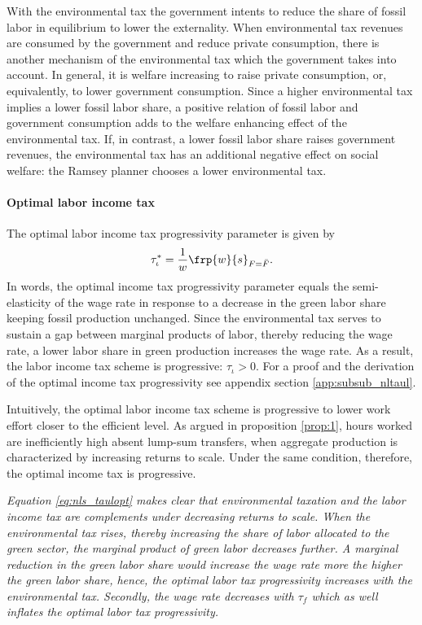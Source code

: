 With the environmental tax the government intents to reduce the share of fossil labor in equilibrium to lower the externality. 
When environmental tax revenues are consumed by the government and reduce private consumption, there is another mechanism of the environmental tax which the government takes into account. In general, it is welfare increasing to raise private consumption, or, equivalently, to lower government consumption. Since a higher environmental tax implies a lower fossil labor share, a positive relation of fossil labor and government consumption adds to the welfare enhancing effect of the environmental tax. If, in contrast, a lower fossil labor share raises government revenues, the environmental tax has an additional negative effect on social welfare: the Ramsey planner chooses a lower environmental tax. 


\paragraph{Optimal labor income tax}
The optimal labor income tax progressivity parameter is given by 
\begin{align}\label{eq:nls_taulopt}
\tau_\iota^*=\frac{1}{w}\frp{w}{s}_{F=\bar{F}}.
\end{align}
In words, the optimal income tax progressivity parameter equals the semi-elasticity of the wage rate in response to a decrease in the green labor share keeping fossil production unchanged. 
Since the environmental tax serves to sustain a gap between marginal products of labor, thereby  reducing the wage rate, a lower labor share in green production increases the wage rate. As a result, the labor income tax scheme is progressive: $\tau_\iota>0$. For a proof and the derivation of the optimal income tax progressivity see appendix section \ref{app:subsub_nltaul}.

Intuitively, the optimal labor income tax scheme is progressive to lower work effort closer to the efficient level. As argued in proposition \ref{prop:1}, hours worked are inefficiently high absent lump-sum transfers, when aggregate production is characterized by increasing returns to scale. Under the same condition, therefore, the optimal income tax is progressive. 

\textit{
Equation \ref{eq:nls_taulopt} makes clear that environmental taxation and the labor income tax are complements under decreasing returns to scale. When the environmental tax rises, thereby increasing the share of labor allocated to the green sector, the marginal product of green labor decreases further. A marginal reduction in the green labor share would increase the wage rate more the higher the green labor share, hence, the optimal labor tax progressivity increases with the environmental tax. 
Secondly, the wage rate decreases with $\tau_f$ which as well inflates the optimal labor tax progressivity.}

